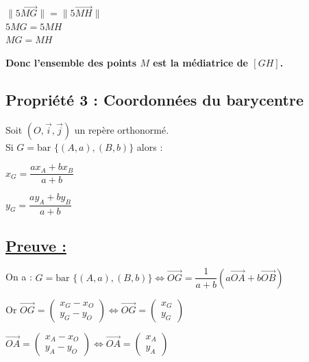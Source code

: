 \documentclass{article}
\begin{document}
\noindent $\| 5 \overrightarrow{MG} \| = \| 5 \overrightarrow{MH} \|$ \\
$5 MG = 5 MH$ \\
$MG = MH$

\vspace{1.5em}

\noindent \textbf{Donc l'ensemble des points $M$ est la médiatrice de $[GH]$.}

\subsection*{Propriété 3 : Coordonnées du barycentre}

\noindent Soit $(O, \vec{i}, \vec{j})$ un repère orthonormé. \\
Si $G = \text{bar } \{(A, a), (B, b)\}$ alors :

\vspace{1.5em}

\noindent $x_G = \dfrac{a x_A + b x_B}{a + b}$

\vspace{1.5em}

\noindent $y_G = \dfrac{a y_A + b y_B}{a + b}$

\subsection*{\underline{\color{red}Preuve :}}

\noindent On a : $G = \text{bar } \{(A, a), (B, b)\} \iff \overrightarrow{OG} = \dfrac{1}{a+b} \left( a \overrightarrow{OA} + b \overrightarrow{OB} \right)$

\vspace{1em}

\noindent Or $\overrightarrow{OG} = \begin{pmatrix} x_G - x_O \\ y_G - y_O \end{pmatrix} \iff \overrightarrow{OG} = \begin{pmatrix} x_G \\ y_G \end{pmatrix}$

\vspace{1em}

\noindent $\overrightarrow{OA} = \begin{pmatrix} x_A - x_O \\ y_A - y_O \end{pmatrix} \iff \overrightarrow{OA} = \begin{pmatrix} x_A \\ y_A \end{pmatrix}$
\end{document}
